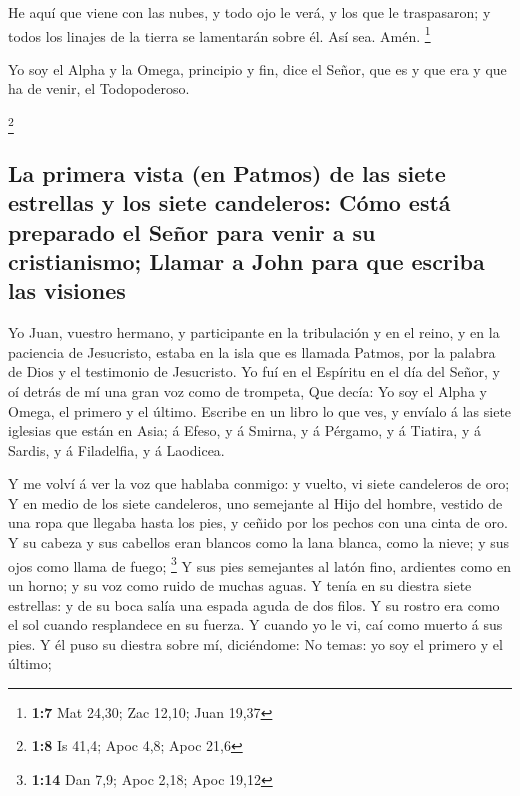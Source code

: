  He aquí que viene con las nubes, y todo ojo le verá, y los
que le traspasaron; y todos los linajes de la tierra se lamentarán sobre
él. Así sea. Amén. \footnote{\textbf{1:7} Mat 24,30; Zac 12,10; Juan
  19,37}

 Yo soy el Alpha y la Omega, principio y fin, dice el Señor,
que es y que era y que ha de venir, el Todopoderoso.

\footnote{\textbf{1:8} Is 41,4; Apoc 4,8; Apoc 21,6}

\hypertarget{la-primera-vista-en-patmos-de-las-siete-estrellas-y-los-siete-candeleros-cuxf3mo-estuxe1-preparado-el-seuxf1or-para-venir-a-su-cristianismo-llamar-a-john-para-que-escriba-las-visiones}{%
\subsection{La primera vista (en Patmos) de las siete estrellas y los
siete candeleros: Cómo está preparado el Señor para venir a su
cristianismo; Llamar a John para que escriba las
visiones}\label{la-primera-vista-en-patmos-de-las-siete-estrellas-y-los-siete-candeleros-cuxf3mo-estuxe1-preparado-el-seuxf1or-para-venir-a-su-cristianismo-llamar-a-john-para-que-escriba-las-visiones}}

 Yo Juan, vuestro hermano, y participante en la tribulación
y en el reino, y en la paciencia de Jesucristo, estaba en la isla que es
llamada Patmos, por la palabra de Dios y el testimonio de Jesucristo.
 Yo fuí en el Espíritu en el día del Señor, y oí detrás de
mí una gran voz como de trompeta,  Que decía: Yo soy el
Alpha y Omega, el primero y el último. Escribe en un libro lo que ves, y
envíalo á las siete iglesias que están en Asia; á Efeso, y á Smirna, y á
Pérgamo, y á Tiatira, y á Sardis, y á Filadelfia, y á Laodicea.

 Y me volví á ver la voz que hablaba conmigo: y vuelto, vi
siete candeleros de oro;  Y en medio de los siete
candeleros, uno semejante al Hijo del hombre, vestido de una ropa que
llegaba hasta los pies, y ceñido por los pechos con una cinta de oro.
 Y su cabeza y sus cabellos eran blancos como la lana
blanca, como la nieve; y sus ojos como llama de fuego; \footnote{\textbf{1:14}
  Dan 7,9; Apoc 2,18; Apoc 19,12}  Y sus pies semejantes al
latón fino, ardientes como en un horno; y su voz como ruido de muchas
aguas.  Y tenía en su diestra siete estrellas: y de su boca
salía una espada aguda de dos filos. Y su rostro era como el sol cuando
resplandece en su fuerza.  Y cuando yo le vi, caí como
muerto á sus pies. Y él puso su diestra sobre mí, diciéndome: No temas:
yo soy el primero y el último;

